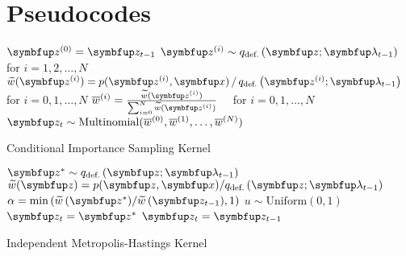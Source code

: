 
\section{Pseudocodes}\label{section:pseudocode}

  \begin{center}
\begin{minipage}[c]{0.63\textwidth}
  \begin{algorithm2e}[H]
    \DontPrintSemicolon
    \SetAlgoLined
    \(\vz^{(0)} = \vz_{t-1}\) \;
    \(\vz^{(i)} \sim q_{\text{def.}}\left(\vz;\vlambda_{t-1}\right)\quad\) for \(i = 1, 2,\ldots, N\) \;
    \(\widetilde{w}(\vz^{(i)}) = p(\vz^{(i)},\vx) \,/\, q_{\text{def.}}\left(\vz^{(i)}; \vlambda_{t-1}\right)\quad\) for \(i = 0, 1,\ldots, N\)\;
    \(\overline{w}^{(i)} = \frac{\widetilde{w}(\vz^{(i)})}{ \sum^{N}_{i=0} \widetilde{w}(\vz^{(i)}) }\quad\) for \(i = 0, 1,\ldots, N\)\;
    \(\vz_{t} \sim \mathrm{Multinomial}(\overline{w}^{(0)}, \overline{w}^{(1)}, \ldots, \overline{w}^{(N)}) \)\;
    \caption{Conditional Importance Sampling Kernel}
  \end{algorithm2e}
\end{minipage}
  \end{center}

  \begin{center}
\begin{minipage}[c]{0.62\textwidth}
  \begin{algorithm2e}[H]
    \DontPrintSemicolon
    \SetAlgoLined
    \(\vz^* \sim q_{\text{def.}}\left(\vz; \vlambda_{t-1}\right)\)\;
    \(\widetilde{w}(\vz) = p(\vz,\vx)/q_{\text{def.}}\left(\vz; \vlambda_{t-1}\right) \)\;
    \(\alpha = \min\left( \widetilde{w}\,(\vz^*)/\widetilde{w}\,(\vz_{t-1}), 1\right)\)\;
    \(u \sim \mathrm{Uniform}(0, 1) \)\;
        {
          \(\vz_t = \vz^*\)
        }
        {
          \(\vz_t = \vz_{t-1}\)
        }
        \caption{Independent Metropolis-Hastings Kernel}
  \end{algorithm2e}
\end{minipage}
  \end{center}


